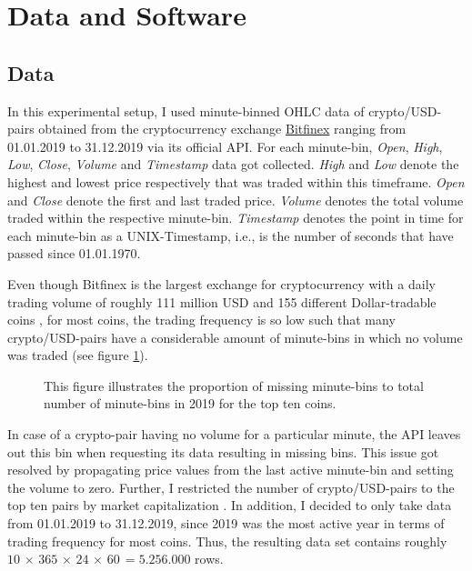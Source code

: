 \section{Data and Software}

\subsection{Data}
In this experimental setup, I used minute-binned OHLC data of crypto/USD-pairs obtained from the cryptocurrency 
exchange \href{ https://www.bitfinex.com/ }{Bitfinex} ranging from 01.01.2019 to 31.12.2019 via its official API.
For each minute-bin, \textit{Open}, \textit{High}, \textit{Low}, \textit{Close}, \textit{Volume} 
and \textit{Timestamp} data got collected. 
\textit{High} and \textit{Low} denote the highest and lowest price respectively
that was traded within this timeframe. 
\textit{Open} and \textit{Close} denote the first and last traded price.
\textit{Volume} denotes the total volume traded within the respective minute-bin.
\textit{Timestamp} denotes the point in time for each minute-bin as a UNIX-Timestamp,
i.e., is the number of seconds that have passed since 01.01.1970.

Even though Bitfinex is the largest exchange for cryptocurrency 
with a daily trading volume of roughly 111 million USD and
155 different Dollar-tradable coins \cite{bitfinex2012},
for most coins, the trading frequency is so low such that 
many crypto/USD-pairs have a considerable amount of minute-bins in 
which no volume was traded (see figure \ref{fig:all_missing_bins_total}).

\begin{figure}[H] 
    \captionsetup{format=plain}
    \caption{
        This figure illustrates the proportion of missing minute-bins
        to total number of minute-bins in 2019 for the top ten coins.
    }
    \label{fig:all_missing_bins_total}
\end{figure}


In case of a crypto-pair having no volume for a particular minute, the API leaves out this bin
when requesting its data resulting in missing bins. 
This issue got resolved by propagating price values from the last active minute-bin
and setting the volume to zero. Further, I restricted the number of crypto/USD-pairs to the
top ten pairs by market capitalization \cite{coinmarketcap2013}. 
In addition, I decided to only take data from 01.01.2019 to 31.12.2019, 
since 2019 was the most active year in terms of trading frequency for most coins.
Thus, the resulting data set contains roughly
$ 10\, \times\, 365\, \times\, 24\, \times\, 60\, = 5.256.000 $ rows.



